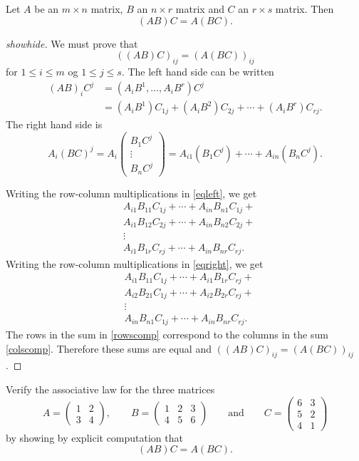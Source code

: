 \documentclass{article}
\begin{document}
\begin{theorem}
Let $A$ be an $m\times n$ matrix, $B$ an $n\times r$ matrix and $C$ an $r\times s$ matrix. Then
$$
(A B) C = A (B C).
$$
\end{theorem}
\begin{proof}[showhide]
  We must prove that 
$$
((A B) C)_{ij} = (A (B C))_{ij}
$$
for $1\leq i \leq m$ og $1\leq j \leq s$. The left hand side can be written
\begin{align}\label{eqleft}
(A B)_i C^j &= (A_i B^1, \dots, A_i B^r) C^j\\
            &= (A_i B^1) C_{1j} + (A_i B^2) C_{2j} + \cdots + (A_i B^r) C_{rj}.
\end{align}
The right hand side is 
\begin{equation}\label{eqright}
A_i (B C)^j = A_i \begin{pmatrix} B_1 C^j \\ \vdots \\ B_n C^j\end{pmatrix}
            = A_{i1} (B_1 C^j) + \cdots + A_{in} (B_n C^j).
          \end{equation}

          Writing the row-column multiplications in \eqref{eqleft}, we get
\begin{align}\label{rowscomp}
&A_{i1} B_{11} C_{1j} + \cdots + A_{in} B_{n1} C_{1j} +\\
&A_{i1} B_{12} C_{2j} + \cdots + A_{in} B_{n2} C_{2j} +\\
&\vdots\\
&A_{i1} B_{1r} C_{rj} + \cdots + A_{in} B_{nr} C_{rj}.
\end{align}
          Writing the row-column multiplications in \eqref{eqright}, we get
\begin{align}\label{colscomp}
&A_{i1} B_{11} C_{1j} + \cdots + A_{i1} B_{1r} C_{rj} +\\
&A_{i2} B_{21} C_{1j} + \cdots + A_{i2} B_{2r} C_{rj} +\\
&\vdots\\
&A_{in} B_{n1} C_{1j} + \cdots + A_{in} B_{nr} C_{rj}.
\end{align}
The rows in the sum in  \eqref{rowscomp} correspond to the columns in the sum \eqref{colscomp}.
Therefore these sums are equal and $((A B) C)_{ij} = (A (B C))_{ij}$.
\end{proof}

\beginshex
Verify the associative law for the three matrices
$$
A =
\begin{pmatrix}
  1 & 2\\
  3 & 4
\end{pmatrix}, \qquad
B =
\begin{pmatrix}
  1 & 2 & 3\\
  4 & 5 & 6
\end{pmatrix}\qquad\text{and}\qquad
C =
\begin{pmatrix}
  6 & 3\\
  5 & 2\\
  4 & 1
\end{pmatrix}
$$
by showing by explicit computation that
$$
(A B) C = A (B C).
$$
\endshex
\end{document}
